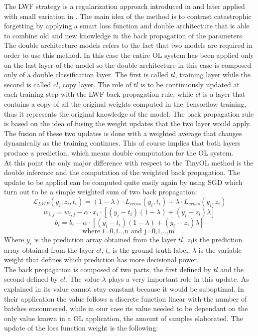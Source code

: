 \documentclass[12pt]{report}
\begin{document}
The LWF strategy is a regularization approach introduced in \autocite{li2017learning} and later applied with small variation in \autocite{maltoni2019continuous}. The main idea of the method is to contrast catastrophic forgetting by applying a smart loss function and double architecture that is able to combine old and new knowledge in the back propagation of the parameters. The double architecture models refers to the fact that two models are required in order to use this method. In this case the entire OL system has been applied only on the last layer of the model so the double architecture in this case is composed only of a double classification layer. The first is called $tl$, training layer while the second is called $cl$, copy layer. The role of $tl$ is to be continuously updated at each training step with the LWF back propagation rule, while $cl$ is a layer that contains a copy of all the original weights computed in the Tensorflow training, thus it represents the original knowledge of the model. The back propagation rule is based on the idea of fusing the weight updates that the two layer would apply. The fusion of these two updates is done with a weighted average that changes dynamically as the training continues. This of course implies that both layers produce a prediction, which means double computation for the OL system.\\
At this point the only major difference with respect to the TinyOL method is the double inference and the computation of the weighted back propagation. The update to be applied can be computed quite easily again by using SGD which turn out to be a simple weighted sum of two back propagation:
%
\[    \mathcal{L}_{LWF} ( y_i, z_i, t_i) =  (1-\lambda) \cdot{L}_{cross}(y_i, t_i) + \lambda \cdot{L}_{cross}(y_i, z_i) \]
\[ w_{i,j} = w_{i,j} - \alpha \cdot x_i \cdot [ (y_i - t_i)(1-\lambda) + (y_i - z_i)\lambda]  \]
\[ b_i = b_i - \alpha \cdot [ (y_i - t_i)(1-\lambda) + (y_i - z_i)\lambda] \]
\[ \text{where i=0,1..,n  and  j=0,1,..,m } \]
%
Where $y_i$ is the prediction array obtained from the layer $tl$, $z_i$is the prediction array obtained from the layer $cl$, $t_i$ is the ground truth label, $\lambda$ is the variable weight that defines which prediction has more decisional power. \\
The back propagation is composed of two parts, the first defined by $tl$ and the second defined by $cl$. The value $\lambda$ plays a very important role in this update. As explained in \autocite{maltoni2019continuous} its value cannot stay constant because it would be suboptimal. In their application the value follows a discrete function linear with the number of batches encountered, while in oiur case its value needed to be dependant on the only value known in a OL application, the amount of samples elaborated. The update of the loss function weight is the following:
\end{document}
